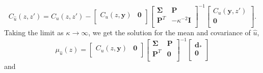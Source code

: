 \documentclass[10pt,a4paper]{article}
\begin{document}
\begin{equation}\label{eq:PosteriorCov2}
C_{\hat{u}}(z,z') = C_u(z,z') - 
                    \left[\begin{array}{cc}
                          C_u(z,\bm{y}) & \bm{0} \\
                          \end{array}\right]
                    \left[\begin{array}{cc}
                          \bm{\Sigma} & \bm{P} \\
                          \bm{P}^T  & -\kappa^{-2} \bm{I} \\
                          \end{array}\right]^{-1}
                    \left[\begin{array}{c}
                          C_u(\bm{y},z') \\
                          \bm{0} \\
                          \end{array}\right].
\end{equation}
Taking the limit as $\kappa \to \infty$, we get the solution for the mean and covariance of $\hat{u}$,
 \begin{equation}\label{eq:PosteriorMean3}
\mu_{\hat{u}}(z) = \left[\begin{array}{cc}
                         C_u(z,\bm{y}) & \bm{0} \\
                         \end{array}\right]
                   \left[\begin{array}{cc}
                         \bm{\Sigma} & \bm{P} \\
                         \bm{P}^T  & \bm{0} \\
                         \end{array}\right]^{-1}
                   \left[\begin{array}{c}
                         \bm{d}_* \\
                         \bm{0} \\
                         \end{array}\right]
\end{equation}    
and
\end{document}
